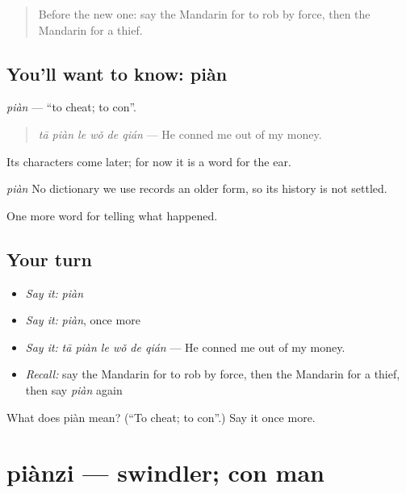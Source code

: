 \label{lesson:ZH-C309-pian}



\begin{quote}
Before the new one: say the Mandarin for to rob by force, then the Mandarin for a thief.
\end{quote}

\subsection*{You'll want to know: piàn}
\emph{piàn} — \textquotedblleft{}to cheat; to con\textquotedblright{}.

\begin{quote}
\emph{tā piàn le wǒ de qián} — He conned me out of my money.
\end{quote}

Its characters come later; for now it is a word for the ear.

\begin{cousinweb}
\emph{piàn} No dictionary we use records an older form, so its history is not settled.
\end{cousinweb}

\begin{grammarlens}[title={What you've built}]
One more word for telling what happened.
\end{grammarlens}

\subsection*{Your turn}
\begin{itemize}
\raggedright
  \item \emph{Say it:} \emph{piàn}
  \item \emph{Say it:} \emph{piàn}, once more
  \item \emph{Say it:} \emph{tā piàn le wǒ de qián} — He conned me out of my money.
  \item \emph{Recall:} say the Mandarin for to rob by force, then the Mandarin for a thief, then say \emph{piàn} again
\end{itemize}

\begin{tcolorbox}[breakable,colback=teal!4,colframe=teal!35!black,title={Before you move on}]
What does piàn mean? (\textquotedblleft{}To cheat; to con\textquotedblright{}.) Say it once more.
\end{tcolorbox}
\section[piànzi]{piànzi — swindler; con man}

